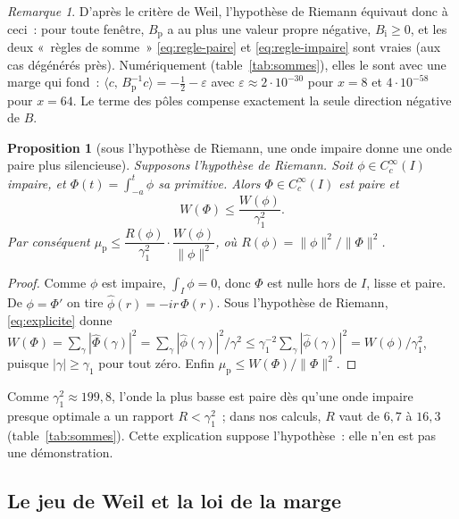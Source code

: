 \documentclass[11pt,a4paper]{article}
\newtheorem{proposition}[theoreme]{Proposition}
\theoremstyle{definition}
\theoremstyle{remark}
\newtheorem*{remarque}{Remarque}
\newcommand{\ps}[2]{\langle #1,\,#2\rangle}
\begin{document}
\begin{remarque}
D'après le critère de Weil, l'hypothèse de Riemann équivaut donc à ceci~: pour toute fenêtre, $B_{\mathrm p}$ a au plus une
valeur propre négative, $B_{\mathrm i}\ge0$, et les deux «~règles de somme~» \eqref{eq:regle-paire} et \eqref{eq:regle-impaire}
sont vraies (aux cas dégénérés près). Numériquement (table~\ref{tab:sommes}), elles le sont avec une marge qui fond~:
$\ps c{B_{\mathrm p}^{-1}c}=-\tfrac12-\varepsilon$ avec $\varepsilon\approx2\cdot10^{-30}$ pour $x=8$ et $4\cdot10^{-58}$ pour $x=64$.
Le terme des pôles compense exactement la seule direction négative de $B$.
\end{remarque}

\begin{proposition}[sous l'hypothèse de Riemann, une onde impaire donne une onde paire plus silencieuse]\label{prop:primitive}
Supposons l'hypothèse de Riemann. Soit $\phi\in C_c^\infty(I)$ impaire, et $\Phi(t)=\int_{-a}^t\phi$ sa primitive. Alors
$\Phi\in C_c^\infty(I)$ est paire et
\[
W(\Phi)\le\frac{W(\phi)}{\gamma_1^{2}}.
\]
Par conséquent $\mu_{\mathrm p}\le \dfrac{R(\phi)}{\gamma_1^2}\cdot\dfrac{W(\phi)}{\|\phi\|^2}$, où $R(\phi)=\|\phi\|^2/\|\Phi\|^2$.
\end{proposition}
\begin{proof}
Comme $\phi$ est impaire, $\int_I\phi=0$, donc $\Phi$ est nulle hors de $I$, lisse et paire. De $\phi=\Phi'$ on tire
$\widehat\phi(r)=-ir\,\widehat\Phi(r)$. Sous l'hypothèse de Riemann, \eqref{eq:explicite} donne
$W(\Phi)=\sum_\gamma|\widehat\Phi(\gamma)|^2=\sum_\gamma|\widehat\phi(\gamma)|^2/\gamma^2\le\gamma_1^{-2}\sum_\gamma|\widehat\phi(\gamma)|^2
=W(\phi)/\gamma_1^2$, puisque $|\gamma|\ge\gamma_1$ pour tout zéro. Enfin $\mu_{\mathrm p}\le W(\Phi)/\|\Phi\|^2$.
\end{proof}

Comme $\gamma_1^2\approx199{,}8$, l'onde la plus basse est paire dès qu'une onde impaire presque optimale a un rapport
$R<\gamma_1^2$~; dans nos calculs, $R$ vaut de $6{,}7$ à $16{,}3$ (table~\ref{tab:sommes}). Cette explication suppose
l'hypothèse~: elle n'en est pas une démonstration.

\subsection*{Le jeu de Weil et la loi de la marge}
\end{document}
